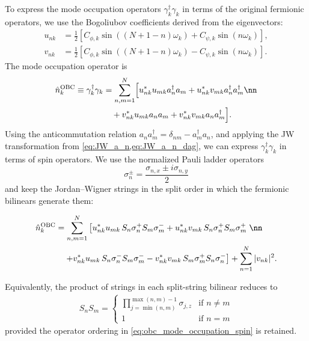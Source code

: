 To express the mode occupation operators $\gamma_k^\dag \gamma_k$ in terms of the original fermionic operators, we use the Bogoliubov coefficients derived from the eigenvectors:
\begin{align}
    u_{nk} &= \frac{1}{2}\left[
        C_{\phi,k}\sin((N+1-n)\omega_k)+C_{\psi,k}\sin(n\omega_k)\right],\\
    v_{nk} &= \frac{1}{2}\left[
        C_{\phi,k}\sin((N+1-n)\omega_k)-C_{\psi,k}\sin(n\omega_k)\right].
\end{align}
The mode occupation operator is
\begin{align}
    \hat n_k^{\mathrm{OBC}}
    \equiv \gamma_k^\dag \gamma_k
    &= \sum_{n,m=1}^N \Bigl[
        u_{nk}^* u_{mk} a_n^\dag a_m
        + u_{nk}^* v_{mk} a_n^\dag a_m^\dag \nn\\
    &\quad
        + v_{nk}^* u_{mk} a_n a_m
        + v_{nk}^* v_{mk} a_n a_m^\dag
    \Bigr].
\end{align}
Using the anticommutation relation $a_n a_m^\dag = \delta_{nm} - a_m^\dag a_n$, and applying the JW transformation from \cref{eq:JW_a_n,eq:JW_a_n_dag}, we can express $\gamma_k^\dag \gamma_k$ in terms of spin operators.  We use the normalized Pauli ladder operators
\begin{equation}
    \sigma_n^\pm=\frac{\sigma_{n,x}\pm i\sigma_{n,y}}{2}
\end{equation}
and keep the Jordan--Wigner strings in the split order in which the fermionic bilinears generate them:
\begin{widetext}
    \begin{align}
        \hat n_k^{\mathrm{OBC}}
        &= \sum_{n,m=1}^N \left[
            u_{nk}^* u_{mk}\, S_n\sigma_n^+ S_m\sigma_m^-
            + u_{nk}^* v_{mk}\, S_n\sigma_n^+ S_m\sigma_m^+
        \right. \nn\\
        &\quad \left.
            + v_{nk}^* u_{mk}\, S_n\sigma_n^- S_m\sigma_m^-
            - v_{nk}^* v_{mk}\, S_m\sigma_m^+ S_n\sigma_n^-
        \right]
        + \sum_{n=1}^N |v_{nk}|^2 .
        \label{eq:obc_mode_occupation_spin}
    \end{align}
\end{widetext}
Equivalently, the product of strings in each split-string bilinear reduces to
\begin{align}
    S_n S_m =
    \begin{cases}
        \prod_{j=\min(n,m)}^{\max(n,m)-1} \sigma_{j,z} & \text{if } n \neq m \\
        1                                              & \text{if } n = m
    \end{cases}
\end{align}
provided the operator ordering in \cref{eq:obc_mode_occupation_spin} is retained.

